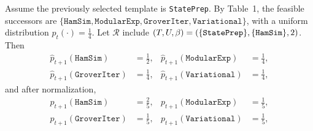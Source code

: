 \begin{example}
\label{ex:pro_update}
\small
Assume the previously selected template is \texttt{StatePrep}. By Table~1,
the feasible successors are \(\{\texttt{HamSim},\texttt{ModularExp},\texttt{GroverIter},\texttt{Variational}\}\),
with a uniform distribution \(p_t(\cdot)=\tfrac{1}{4}\).
Let \(\mathcal{R}\) include \((T,U,\beta)=(\{\texttt{StatePrep}\},\\  \{\texttt{HamSim}\},2)\).
Then
\[
\begin{aligned}
\widehat p_{t+1}(\texttt{HamSim})&=\tfrac{1}{2}, &
\widehat p_{t+1}(\texttt{ModularExp})&=\tfrac{1}{4},\\
\widehat p_{t+1}(\texttt{GroverIter})&=\tfrac{1}{4}, &
\widehat p_{t+1}(\texttt{Variational})&=\tfrac{1}{4},
\end{aligned}
\]
and after normalization,
\[
\begin{aligned}
 p_{t+1}(\texttt{HamSim})&=\tfrac{2}{5}, &
 p_{t+1}(\texttt{ModularExp})&=\tfrac{1}{5},\\
p_{t+1}(\texttt{GroverIter})&=\tfrac{1}{5}, &
 p_{t+1}(\texttt{Variational})&=\tfrac{1}{5},
\end{aligned}
\]
\end{example}


